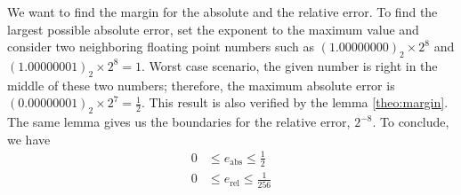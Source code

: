 %
%
\begin{exmp}
    We want to find the margin for the absolute and the relative error. To find the largest possible absolute error, set the exponent to the maximum value and consider two neighboring floating point numbers such as \((1.00000000)_2 \times 2^8\) and \((1.00000001)_2 \times 2^8 = 1\). Worst case scenario, the given number is right in the middle of these two numbers; therefore, the maximum absolute error is \((0.00000001)_2 \times 2^7 = \frac{1}{2}\). This result is also verified by the lemma \ref{theo:margin}. The same lemma gives us the boundaries for the relative error, \(2^{-8}\). To conclude, we have
    \begin{align*}
        0 &\leq e_\text{abs} \leq \frac{1}{2} \\
        0 &\leq e_\text{rel} \leq \frac{1}{256}
    \end{align*}
\end{exmp}
%
%
%
